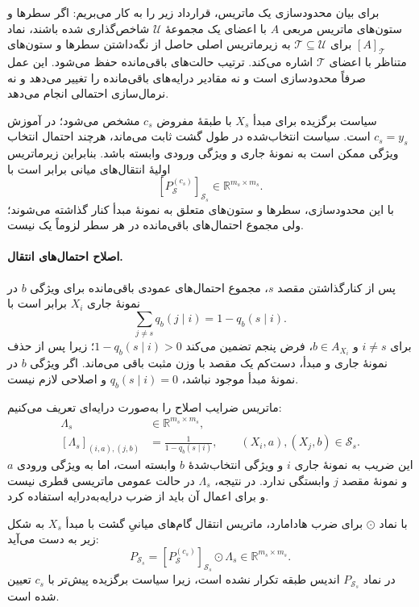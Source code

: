 برای بیان محدودسازی یک ماتریس، قرارداد زیر را
به کار می‌بریم: اگر سطرها و ستون‌های ماتریس
مربعی $A$ با اعضای یک مجموعهٔ $\mathcal U$
شاخص‌گذاری شده باشند، نماد $[A]_{\mathcal T}$
برای $\mathcal T\subseteq\mathcal U$ به زیرماتریس اصلی
حاصل از نگه‌داشتن سطرها و ستون‌های متناظر با
اعضای $\mathcal T$ اشاره می‌کند. ترتیب حالت‌های
باقی‌مانده حفظ می‌شود. این عمل صرفاً محدودسازی
است و نه مقادیر درایه‌های باقی‌مانده را تغییر
می‌دهد و نه نرمال‌سازی احتمالی انجام می‌دهد.

سیاست برگزیده برای مبدأ $X_s$ با طبقهٔ مفروض
$c_s$ مشخص می‌شود؛ در آموزش $c_s=y_s$ است.
سیاست انتخاب‌شده در طول گشت ثابت می‌ماند،
هرچند احتمال انتخاب ویژگی ممکن است به نمونهٔ
جاری و ویژگی ورودی وابسته باشد. بنابراین
زیرماتریس اولیهٔ انتقال‌های میانی برابر است با
\[
\left[P_{\mathcal S}^{(c_s)}\right]_{\mathcal S_s}
\in\mathbb R^{m_s\times m_s}.
\]
با این محدودسازی، سطرها و ستون‌های متعلق به
نمونهٔ مبدأ کنار گذاشته می‌شوند؛ ولی مجموع
احتمال‌های باقی‌مانده در هر سطر لزوماً یک نیست.

\paragraph{اصلاح احتمال‌های انتقال.}
پس از کنارگذاشتن مقصد $s$، مجموع احتمال‌های
عمودی باقی‌مانده برای ویژگی $b$ در نمونهٔ
جاری $X_i$ برابر است با
\[
\sum_{j\ne s}q_b(j\mid i)=1-q_b(s\mid i).
\]
برای $i\ne s$ و $b\in A_{X_i}$، فرض پنجم
تضمین می‌کند $1-q_b(s\mid i)>0$؛ زیرا
پس از حذف نمونهٔ جاری و مبدأ، دست‌کم یک
مقصد با وزن مثبت باقی می‌ماند. اگر ویژگی
$b$ در نمونهٔ مبدأ موجود نباشد،
$q_b(s\mid i)=0$ و اصلاحی لازم نیست.

ماتریس ضرایب اصلاح را به‌صورت درایه‌ای
تعریف می‌کنیم:
\begin{equation}\label{cmp:eq:ch3-origin-correction-matrix}
\boxed{
\begin{aligned}
\Lambda_s&\in\mathbb R^{m_s\times m_s},\\
[\Lambda_s]_{(i,a),(j,b)}
&=\frac{1}{1-q_b(s\mid i)},
\qquad (X_i,a),(X_j,b)\in\mathcal S_s.
\end{aligned}
}
\end{equation}
این ضریب به نمونهٔ جاری $i$ و ویژگی
انتخاب‌شدهٔ $b$ وابسته است، اما به ویژگی
ورودی $a$ و نمونهٔ مقصد $j$ وابستگی ندارد.
در نتیجه، $\Lambda_s$ در حالت عمومی
ماتریسی قطری نیست و برای اعمال آن باید
از ضرب درایه‌به‌درایه استفاده کرد.

با نماد $\odot$ برای ضرب هادامارد،
ماتریس انتقال گام‌های میانیِ گشت با
مبدأ $X_s$ به شکل زیر به دست می‌آید:
\begin{equation}\label{cmp:eq:ch3-origin-masked-transition}
\boxed{
P_{\mathcal S_s}
=\left[P_{\mathcal S}^{(c_s)}\right]_{\mathcal S_s}
\odot\Lambda_s
\in\mathbb R^{m_s\times m_s}.
}
\end{equation}
در نماد $P_{\mathcal S_s}$ اندیس طبقه
تکرار نشده است، زیرا سیاست برگزیده پیش‌تر
با $c_s$ تعیین شده است.

